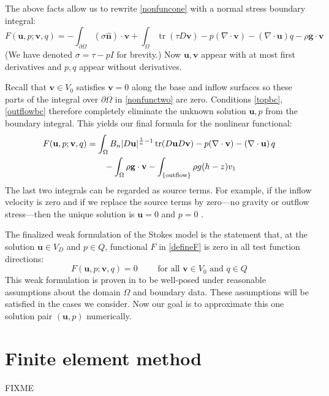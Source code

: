 \documentclass[letterpaper,final,12pt,reqno]{amsart}
\newcommand{\trace}{\operatorname{tr}}
\newcommand{\hbn}{\hat{\mathbf{n}}}
\newcommand{\bu}{\mathbf{u}}
\newcommand{\bv}{\mathbf{v}}
\begin{document}
The above facts allow us to rewrite \eqref{nonfuncone} with a normal stress boundary integral:
\begin{equation}
F(\bu,p;\bv,q) = -\int_{\partial\Omega} (\sigma \hbn)\cdot \bv + \int_\Omega \trace(\tau D\bv) - p (\nabla \cdot \bv) - \left(\nabla \cdot \bu\right) q - \rho \mathbf{g} \cdot \bv \label{nonfunctwo}
\end{equation}
(We have denoted $\sigma=\tau-pI$ for brevity.)  Now $\bu,\bv$ appear with at most first derivatives and $p,q$ appear without derivatives.

Recall that $\bv\in V_0$ satisfies $\bv=0$ along the base and inflow surfaces so these parts of the integral over $\partial\Omega$ in \eqref{nonfunctwo} are zero.  Conditions \eqref{topbc}, \eqref{outflowbc} therefore completely eliminate the unknown solution $\bu,p$ from the boundary integral.  This yields our final formula for the nonlinear functional:
\begin{align}
F(\bu,p;\bv,q) &= \int_\Omega B_n |D\bu|^{\frac{1}{n} - 1} \trace(D\bu D\bv) - p (\nabla \cdot \bv) - \left(\nabla \cdot \bu\right) q \label{defineF} \\
    &\qquad  - \int_\Omega \rho \mathbf{g} \cdot \bv - \int_{\{\text{outflow}\}} \rho g (h-z) v_1  \notag
\end{align}
The last two integrals can be regarded as source terms.  For example, if the inflow velocity is zero and if we replace the source terms by zero---no gravity or outflow stress---then the unique solution is $\bu=0$ and $p=0$ \cite{Elmanetal2014}.

The finalized weak formulation of the Stokes model is the statement that, at the solution $\bu\in V_D$ and $p\in Q$, functional $F$ in \eqref{defineF} is zero in all test function directions:
\begin{equation}
F(\bu,p;\bv,q) = 0 \qquad \text{ for all } \bv\in V_0 \text{ and } q\in Q  \label{weak}
\end{equation}
This weak formulation is proven in \cite{JouvetRappaz2011} to be well-posed under reasonable assumptions about the domain $\Omega$ and boundary data.  These assumptions will be satisfied in the cases we consider.  Now our goal is to approximate this one solution pair $(\bu,p)$ numerically.


\section{Finite element method}

FIXME
\end{document}
